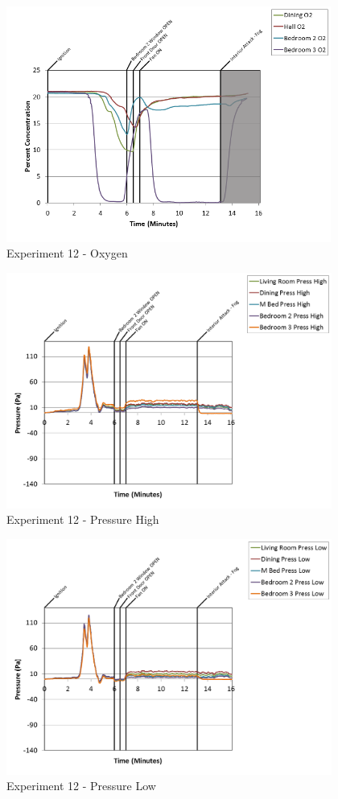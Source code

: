 \documentclass{article}
\begin{document}
\begin{appendices}
\clearpage

\begin{figure}[h!]
	\centering
	\includegraphics[height=3.05in]{0_Images/Results_Charts/Exp_12_Charts/Oxygen.png}
	\caption{Experiment 12 - Oxygen}
\end{figure}


\begin{figure}[h!]
	\centering
	\includegraphics[height=3.05in]{0_Images/Results_Charts/Exp_12_Charts/PressureHigh.png}
	\caption{Experiment 12 - Pressure High}
\end{figure}

\clearpage

\begin{figure}[h!]
	\centering
	\includegraphics[height=3.05in]{0_Images/Results_Charts/Exp_12_Charts/PressureLow.png}
	\caption{Experiment 12 - Pressure Low}
\end{figure}



\end{appendices}
\end{document}
